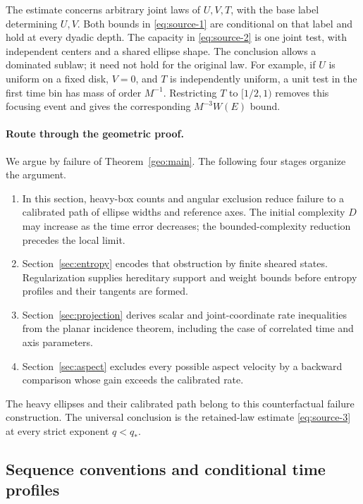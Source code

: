 The estimate concerns arbitrary joint laws of \(U,V,T\), with the
base label determining \(U,V\).  Both bounds in
\eqref{eq:source-1} are conditional on that label and hold at every
dyadic depth.  The capacity in \eqref{eq:source-2} is one joint test,
with independent centers and a shared ellipse shape.  The conclusion
allows a dominated sublaw; it need not hold for the original law.
For example, if \(U\) is uniform on a fixed disk, \(V=0\), and \(T\)
is independently uniform, a unit test in the first time bin has mass
of order \(M^{-1}\).  Restricting \(T\) to \([1/2,1)\) removes this
focusing event and gives the corresponding \(M^{-3}W(E)\) bound.

\paragraph{Route through the geometric proof.}
We argue by failure of Theorem~\ref{geo:main}.  The following four stages
organize the argument.
\begin{enumerate}[label=\textup{(\roman*)}]
\item In this section, heavy-box counts and angular exclusion reduce
failure to a calibrated path of ellipse widths and reference axes.
The initial complexity \(D\) may increase as the time error decreases;
the bounded-complexity reduction precedes the local limit.
\item Section~\ref{sec:entropy} encodes that obstruction by finite
sheared states.  Regularization supplies hereditary support and weight
bounds before entropy profiles and their tangents are formed.
\item Section~\ref{sec:projection} derives scalar and joint-coordinate
rate inequalities from the planar incidence theorem, including the
case of correlated time and axis parameters.
\item Section~\ref{sec:aspect} excludes every possible aspect velocity
by a backward comparison whose gain exceeds the calibrated rate.
\end{enumerate}
The heavy ellipses and their calibrated path belong to this
counterfactual failure construction.  The universal conclusion is the
retained-law estimate \eqref{eq:source-3} at every strict exponent
\(q<q_*\).

\subsection{Sequence conventions and conditional time profiles}

